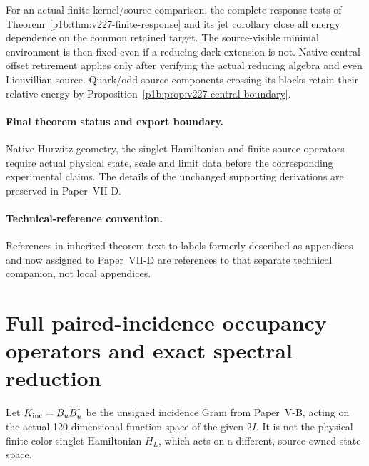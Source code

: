\documentclass[12pt,a4paper]{article}
\begin{document}
For an actual finite kernel/source comparison, the complete response tests
of Theorem~\ref{p1b:thm:v227-finite-response} and its jet corollary close
all energy dependence on the common retained target. The source-visible
minimal environment is then fixed even if a reducing dark extension is
not. Native central-offset retirement applies only after verifying the
actual reducing algebra and even Liouvillian source. Quark/odd source
components crossing its blocks retain their relative energy by
Proposition~\ref{p1b:prop:v227-central-boundary}.


\paragraph{Final theorem status and export boundary.}
Native Hurwitz geometry, the singlet Hamiltonian and finite source operators require actual physical state, scale and limit data before the corresponding experimental claims. The details of the unchanged supporting derivations are preserved in Paper~VII-D.

\paragraph{Technical-reference convention.} References in inherited theorem text to labels formerly described as appendices and now assigned to Paper~VII-D are references to that separate technical companion, not local appendices.



\section{Full paired-incidence occupancy operators and exact spectral reduction}
\label{p10:sec:v338-full-petersen-comparison}
Let $K_{\rm inc}=B_uB_u^\dagger$ be the unsigned incidence Gram
from Paper~V-B, acting on the actual 120-dimensional function space
of the given $2I$.  It is not the physical finite color-singlet
Hamiltonian $H_L$, which acts on a different, source-owned state space.
\end{document}
